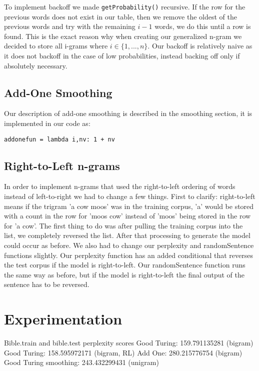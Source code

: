 \documentclass{article}
\begin{document}
To implement backoff we made \texttt{getProbability()} recursive. If the row for the previous words does not exist in our table, then we remove the oldest of the previous words and try with the remaining $i-1$ words, we do this until a row is found. This is the exact reason why when creating our generalized n-gram we decided to store all i-grams where $i \in \lbrace 1,...,n \rbrace$. Our backoff is relatively naive as it does not backoff in the case of low probabilities, instead backing off only if absolutely necessary.

\subsection{Add-One Smoothing}

Our description of add-one smoothing is described in the smoothing section, it is implemented in our code as: \begin{verbatim}
addonefun = lambda i,nv: 1 + nv
\end{verbatim}

\subsection{Right-to-Left n-grams}

In order to implement n-grams that used the right-to-left ordering of words instead of left-to-right we had to change a few things. First to clarify: right-to-left means if the trigram 'a cow moos' was in the training corpus, 'a' would be stored with a count in the row for 'moos cow' instead of 'moos' being stored in the row for 'a cow'. The first thing to do was after pulling the training corpus into the list, we completely reversed the list. After that processing to generate the model could occur as before. We also had to change our perplexity and randomSentence functions slightly. Our perplexity function has an added conditional that reverses the test corpus if the model is right-to-left. Our randomSentence function runs the same way as before, but if the model is right-to-left the final output of the sentence has to be reversed.

\section{Experimentation}

Bible.train and bible.test perplexity scores 
Good Turing: 159.791135281 (bigram)
Good Turing: 158.595972171 (bigram, RL)
Add One: 280.215776754 (bigram)
Good Turing smoothing: 243.432299431 (unigram)
\end{document}
